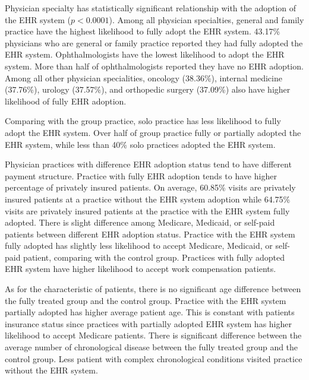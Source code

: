 Physician specialty has statistically significant relationship with the adoption of the EHR system ($p < 0.0001$). Among all physician specialties, general and family practice have the highest likelihood to fully adopt the EHR system. 43.17\% physicians who are general or family practice reported they had fully adopted the EHR system. Ophthalmologists have the lowest likelihood to adopt the EHR system. More than half of ophthalmologists reported they have no EHR adoption. Among all other physician specialities, oncology (38.36\%), internal medicine (37.76\%), urology (37.57\%), and orthopedic surgery (37.09\%) also have higher likelihood of fully EHR adoption.
 
Comparing with the group practice, solo practice has less likelihood to fully adopt the EHR system. Over half of group practice fully or partially adopted the EHR system, while less than 40\% solo practices adopted the EHR system. 

Physician practices with difference EHR adoption status tend to have different payment structure. Practice with fully EHR adoption tends to have higher percentage of privately insured patients. On average, 60.85\% visits are privately insured patients at a practice without the EHR system adoption while 64.75\% visits are privately insured patients at the practice with the EHR system fully adopted. There is slight difference among Medicare, Medicaid, or self-paid patients between different EHR adoption status. Practice with the EHR system fully adopted has slightly less likelihood to accept Medicare, Medicaid, or self-paid patient, comparing with the control group. Practices with fully adopted EHR system have higher likelihood to accept work compensation patients.

As for the characteristic of patients, there is no significant age difference between the fully treated group and the control group. Practice with the EHR system partially adopted has higher average patient age. This is constant with patients insurance status since practices with partially adopted EHR system has higher likelihood to accept Medicare patients.  There is significant difference between the average number of chronological disease between the fully treated group and the control group. Less patient with complex chronological conditions visited practice without the EHR system. 


